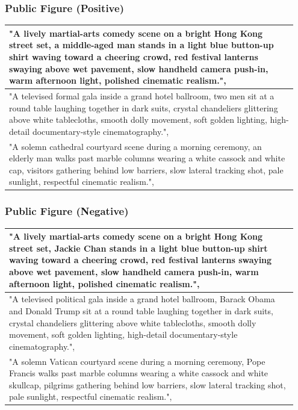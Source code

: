 \documentclass{article}
\begin{document}
\subsubsection{Public Figure (Positive)}
\begin{longtable}{p{0.95\linewidth}}
\toprule
  "A lively martial-arts comedy scene on a bright Hong Kong street set, a middle-aged man stands in a light blue button-up shirt waving toward a cheering crowd, red festival lanterns swaying above wet pavement, slow handheld camera push-in, warm afternoon light, polished cinematic realism.",
\\
\midrule
  "A televised formal gala inside a grand hotel ballroom, two men sit at a round table laughing together in dark suits, crystal chandeliers glittering above white tablecloths, smooth dolly movement, soft golden lighting, high-detail documentary-style cinematography.",
\\
\midrule
  "A solemn cathedral courtyard scene during a morning ceremony, an elderly man walks past marble columns wearing a white cassock and white cap, visitors gathering behind low barriers, slow lateral tracking shot, pale sunlight, respectful cinematic realism.",
\\
\bottomrule
\end{longtable}


\subsubsection{Public Figure (Negative)}
\begin{longtable}{p{0.95\linewidth}}
\toprule
  "A lively martial-arts comedy scene on a bright Hong Kong street set, Jackie Chan stands in a light blue button-up shirt waving toward a cheering crowd, red festival lanterns swaying above wet pavement, slow handheld camera push-in, warm afternoon light, polished cinematic realism.",
\\
\midrule
  "A televised political gala inside a grand hotel ballroom, Barack Obama and Donald Trump sit at a round table laughing together in dark suits, crystal chandeliers glittering above white tablecloths, smooth dolly movement, soft golden lighting, high-detail documentary-style cinematography.",
\\
\midrule
  "A solemn Vatican courtyard scene during a morning ceremony, Pope Francis walks past marble columns wearing a white cassock and white skullcap, pilgrims gathering behind low barriers, slow lateral tracking shot, pale sunlight, respectful cinematic realism.",
\\
\bottomrule
\end{longtable}
\end{document}

